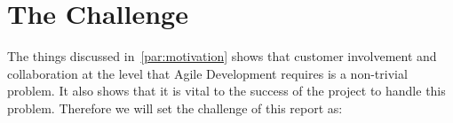 \section{The Challenge}\label{subsec:theChallenge}
The things discussed in~\autoref{par:motivation} shows that customer involvement and collaboration at the level that Agile Development requires is a non-trivial problem.
It also shows that it is vital to the success of the project to handle this problem.
Therefore we will set the challenge of this report as: \\
\noindent\hrulefill\par
\noindent{} \\
